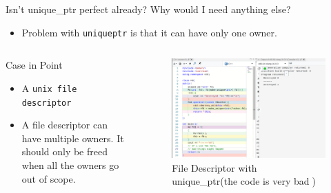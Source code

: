 \documentclass[
  10pt,
  ignorenonframetext,
]{beamer}
\providecommand{\tightlist}{%
  \setlength{\itemsep}{0pt}\setlength{\parskip}{0pt}}
\begin{document}
\begin{frame}{Isn't unique\_ptr perfect already?
Why would I need anything else?}
\protect\hypertarget{isnt-unique_ptr-perfect-already-why-would-i-need-anything-else}{}
\begin{itemize}
\tightlist
\item
  Problem with \texttt{unique\textunderscore ptr}
  is that it can have only one owner.
\end{itemize}

\pause

\begin{columns}[T]
\begin{column}{0.3\textwidth}
\begin{block}{Case in Point}
\protect\hypertarget{case-in-point}{}
\begin{itemize}
\tightlist
\item
  A \texttt{unix file descriptor}
\end{itemize}

\pause

\begin{itemize}
\tightlist
\item
  A file descriptor can have multiple owners. It
  should only be freed when all the owners go out
  of scope.
\end{itemize}
\end{block}
\end{column}

\begin{column}{0.7\textwidth}
\pause

\begin{figure}
\centering
\includegraphics{images/./fd.png}
\caption{File Descriptor with unique\_ptr(the code
is very bad🥲)}
\end{figure}
\end{column}
\end{columns}

\pause


\pause

\end{frame}
\end{document}

